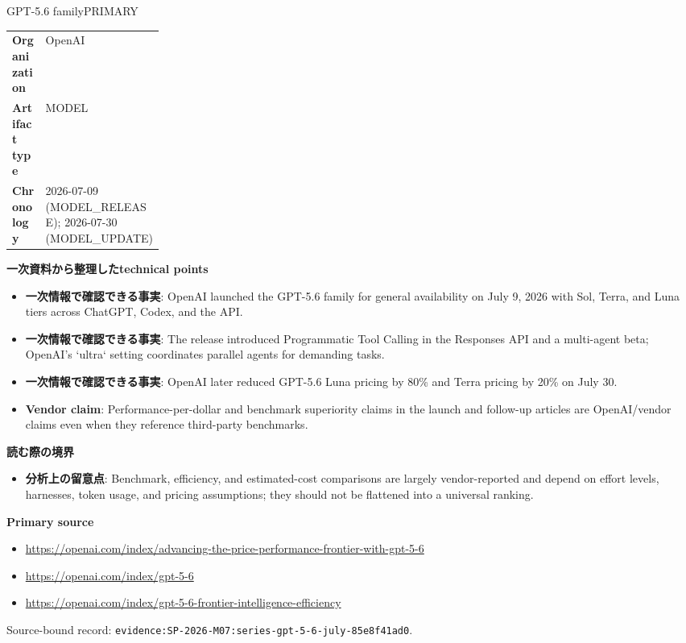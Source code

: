 \begin{technicalnote}{GPT-5.6 family}{PRIMARY}
\begin{tabularx}{\linewidth}{@{}>{\bfseries}p{0.22\linewidth}X@{}}
Organization & OpenAI \\
Artifact type & MODEL \\
Chronology & 2026-07-09 (MODEL\_RELEASE); 2026-07-30 (MODEL\_UPDATE) \\
\end{tabularx}
\smallskip
{\bfseries 一次資料から整理したtechnical points}
\begin{itemize}[leftmargin=1.5em,itemsep=0.35em]
\item \textbf{一次情報で確認できる事実}: OpenAI launched the GPT-5.6 family for general availability on July 9, 2026 with Sol, Terra, and Luna tiers across ChatGPT, Codex, and the API.
\item \textbf{一次情報で確認できる事実}: The release introduced Programmatic Tool Calling in the Responses API and a multi-agent beta; OpenAI's `ultra` setting coordinates parallel agents for demanding tasks.
\item \textbf{一次情報で確認できる事実}: OpenAI later reduced GPT-5.6 Luna pricing by 80\% and Terra pricing by 20\% on July 30.
\item \textbf{Vendor claim}: Performance-per-dollar and benchmark superiority claims in the launch and follow-up articles are OpenAI/vendor claims even when they reference third-party benchmarks.
\end{itemize}
{\bfseries 読む際の境界}
\begin{itemize}[leftmargin=1.5em,itemsep=0.35em]
\item \textbf{分析上の留意点}: Benchmark, efficiency, and estimated-cost comparisons are largely vendor-reported and depend on effort levels, harnesses, token usage, and pricing assumptions; they should not be flattened into a universal ranking.
\end{itemize}
{\bfseries Primary source}
\begingroup\sloppy
\begin{itemize}[leftmargin=1.5em,itemsep=0.25em]
\item {\scriptsize\url{https://openai.com/index/advancing-the-price-performance-frontier-with-gpt-5-6}}
\item {\scriptsize\url{https://openai.com/index/gpt-5-6}}
\item {\scriptsize\url{https://openai.com/index/gpt-5-6-frontier-intelligence-efficiency}}
\end{itemize}
\endgroup
{\scriptsize\color{SurveyMuted}Source-bound record: \texttt{evidence:SP-2026-M07:series-gpt-5-6-july-85e8f41ad0}.}
\end{technicalnote}
\medskip

